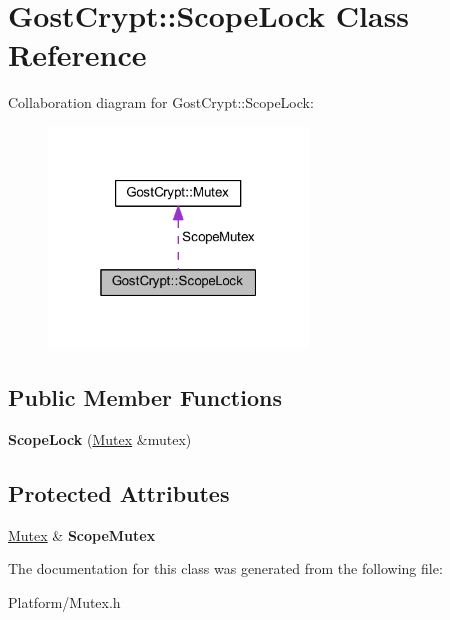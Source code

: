 \hypertarget{class_gost_crypt_1_1_scope_lock}{}\section{Gost\+Crypt\+:\+:Scope\+Lock Class Reference}
\label{class_gost_crypt_1_1_scope_lock}


Collaboration diagram for Gost\+Crypt\+:\+:Scope\+Lock\+:
\nopagebreak
\begin{figure}[H]
\begin{center}
\leavevmode
\includegraphics[width=196pt]{class_gost_crypt_1_1_scope_lock__coll__graph}
\end{center}
\end{figure}
\subsection*{Public Member Functions}
\begin{DoxyCompactItemize}
\item 
\mbox{\label{class_gost_crypt_1_1_scope_lock_a8cdb6b3aecae993f1619a209b191ea74}} 
{\bfseries Scope\+Lock} (\hyperlink{class_gost_crypt_1_1_mutex}{Mutex} \&mutex)
\end{DoxyCompactItemize}
\subsection*{Protected Attributes}
\begin{DoxyCompactItemize}
\item 
\mbox{\label{class_gost_crypt_1_1_scope_lock_a15bac0c0edb77460ab85842b5d74f6ae}} 
\hyperlink{class_gost_crypt_1_1_mutex}{Mutex} \& {\bfseries Scope\+Mutex}
\end{DoxyCompactItemize}


The documentation for this class was generated from the following file\+:\begin{DoxyCompactItemize}
\item 
Platform/Mutex.\+h\end{DoxyCompactItemize}

